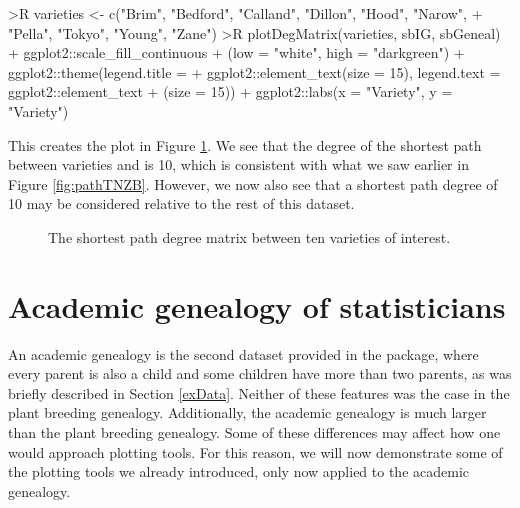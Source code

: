 \documentclass[article,shortnames]{jss}
\begin{document}
\begin{Code}
>R varieties <- c("Brim", "Bedford", "Calland", "Dillon", "Hood", "Narow",
+    "Pella", "Tokyo", "Young", "Zane")
>R plotDegMatrix(varieties, sbIG, sbGeneal) + ggplot2::scale_fill_continuous
+    (low = "white", high = "darkgreen") + ggplot2::theme(legend.title =
+    ggplot2::element_text(size = 15), legend.text = ggplot2::element_text
+    (size = 15)) + ggplot2::labs(x = "Variety", y = "Variety")
\end{Code}

This creates the plot in Figure \ref{fig:degMatrix}. We see that the degree of the shortest path between varieties  and  is 10, which is consistent with what we saw earlier in Figure \ref{fig:pathTNZB}. However, we now also see that a shortest path degree of 10 may be considered relative to the rest of this dataset.

\begin{figure}[h]
    \centering
    \caption{The shortest path degree matrix between ten varieties of interest.}
    \label{fig:degMatrix}
\end{figure}

\section{Academic genealogy of statisticians}

An academic genealogy is the second dataset provided in the package, where every parent is also a child and some children have more than two parents, as was briefly described in Section \ref{exData}. Neither of these features was the case in the plant breeding genealogy. Additionally, the academic genealogy is much larger than the plant breeding genealogy. Some of these differences may affect how one would approach  plotting tools. For this reason, we will now demonstrate some of the  plotting tools we already introduced, only now applied to the academic genealogy.
\end{document}
